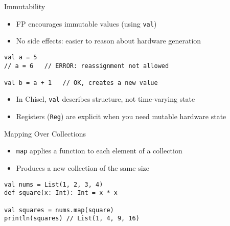 \begin{frame}[fragile]{Immutability}
\begin{itemize}
    \item FP encourages immutable values (using \texttt{val})
    \item No side effects: easier to reason about hardware generation
\end{itemize}

\begin{verbatim}
val a = 5
// a = 6   // ERROR: reassignment not allowed

val b = a + 1   // OK, creates a new value
\end{verbatim}

\begin{itemize}
    \item In Chisel, \texttt{val} describes structure, not time-varying state
    \item Registers (\texttt{Reg}) are explicit when you need mutable hardware state
\end{itemize}
\end{frame}

%
%

\begin{frame}[fragile]{Mapping Over Collections}
\begin{itemize}
    \item \texttt{map} applies a function to each element of a collection
    \item Produces a new collection of the same size
\end{itemize}

\begin{verbatim}
val nums = List(1, 2, 3, 4)
def square(x: Int): Int = x * x

val squares = nums.map(square)
println(squares) // List(1, 4, 9, 16)
\end{verbatim}

\end{frame}

